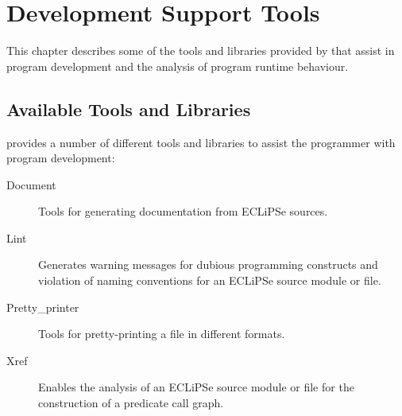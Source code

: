 %
% 
% 
% 
% 
\chapter{Development Support Tools}
\label{chapdevelsupport}

This chapter describes some of the tools and libraries provided by 
\eclipse{} that assist in program development and the analysis of 
program runtime behaviour.
\section{Available Tools and Libraries}

\eclipse{} provides a number of different tools and libraries to assist 
the programmer with program development:

\begin{description}
\item[Document] Tools for generating documentation from ECLiPSe
sources.
\item[Lint] Generates warning messages for dubious programming 
constructs and violation of naming conventions for an ECLiPSe source 
module or file.
\item[Pretty_printer] Tools for pretty-printing a file in 
different formats.
\item[Xref] Enables the analysis of an ECLiPSe source module or
file for the construction of a predicate call graph.
\end{description}

